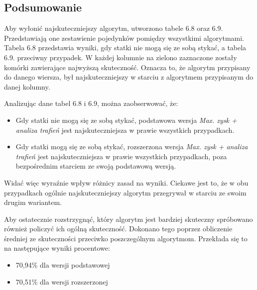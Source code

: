 \subsection{Podsumowanie}

Aby wyłonić najskuteczniejszy algorytm, utworzono tabele 6.8 oraz 6.9. Przedstawiają one zestawienie pojedynków pomiędzy wszystkimi algorytmami. Tabela 6.8 przedstawia wyniki, gdy statki nie mogą się ze sobą stykać, a tabela 6.9. przeciwny przypadek. W każdej kolumnie na zielono zaznaczone zostały komórki zawierające najwyższą skuteczność. Oznacza to, że algorytm przypisany do danego wiersza, był najskuteczniejszy w starciu z algorytmem przypisanym do danej kolumny.

Analizując dane tabel 6.8 i 6.9, można zaobserwować, że:

\begin{itemize}
    \item Gdy statki nie mogą się ze sobą stykać, podstawowa wersja  \emph{Max. zysk + analiza trafień} jest najskuteczniejsza w prawie wszystkich przypadkach. 
    \item Gdy statki mogą się ze sobą stykać, rozszerzona wersja  \emph{Max. zysk + analiza trafień} jest najskuteczniejsza w prawie wszystkich przypadkach, poza bezpośrednim starciem ze swoją podstawową wersją.
\end{itemize}

Widać więc wyraźnie wpływ różnicy zasad na wyniki. Ciekawe jest to, że w obu przypadkach ogólnie najskuteczniejszy algorytm przegrywał w starciu ze swoim drugim wariantem.

Aby ostatecznie rozstrzygnąć, który algorytm jest bardziej skuteczny spróbowano również policzyć ich ogólną skuteczność. Dokonano tego poprzez obliczenie średniej ze skuteczności przeciwko poszczególnym algorytmom. Przekłada się to na następujące wyniki procentowe:

\begin{itemize}
    \item 70,94\% dla wersji podstawowej
    \item 70,51\% dla wersji rozszerzonej
\end{itemize}

